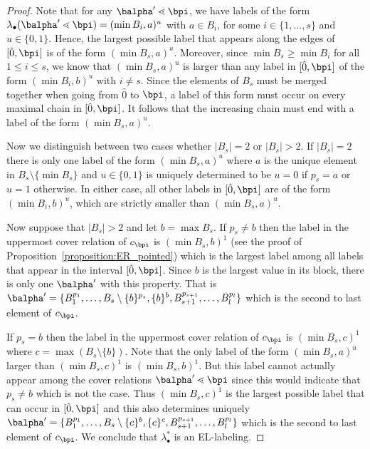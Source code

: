 \begin{proof}
Note that for any $\balpha'\lessdot \bpi$, we have labels of the form $\lambda_{\bullet}(\balpha'\lessdot \bpi)=(\min B_i,a)^u$ with $a\in B_i$, for some  $i\in\{1,\dots,s\}$ and $u\in\{0,1\}$. Hence,  the largest possible label that appears along the edges of $[\hat{0},\bpi]$ is of the form $(\min B_{s},a)^u$.  Moreover, since $\min B_s \geq \min B_i$ for all $1\leq i\leq s$, we know that $(\min B_{s},a)^u$ is larger than any label in $[\hat{0}, \bpi]$ of the form $(\min B_i, b)^u$ with $i\neq s$.   Since the elements of $B_s$ must be merged together when going from $\hat{0}$ to $\bpi$,  a label of this form must occur on every maximal chain in $[\hat{0},\bpi]$.  It follows that the increasing chain must end with a label of the form $(\min B_{s},a)^u$.  

Now we distinguish between two cases whether $|B_{s}|=2$ or $|B_{s}|>2$. If $|B_{s}|=2$ there is only one label of the form $(\min B_{s},a)^u$ where $a$ is the unique element in $B_{s}\setminus \{\min B_{s}\}$ and $u\in\{0,1\}$ is uniquely determined to be $u=0$ if $p_s=a$ or $u=1$ otherwise. In either case, all other labels in $[\hat{0},\bpi]$ are of the form $(\min B_{i},b)^u$, which are strictly smaller than $(\min B_{s},a)^u$.



Now suppose that $|B_{s}|>2$ and let $b=\max B_s$. If $p_s\neq b$ then the label in the uppermost cover relation of $c_{\bpi}$ is $(\min B_{s},b)^1$ (see the proof of Proposition~\ref{proposition:ER_pointed}) which is the largest label among all labels that appear in the interval $[\hat{0},\bpi]$.  Since $b$ is the largest value in its block, there is only one $\balpha'$ with this property. That is $\balpha'=\{B_1^{p_1},\dots,B_s\setminus\{b\}^{p_s},\{b\}^{b},B_{s+1}^{p_{s+1}},\dots,B_l^{p_l}\}$ which is the second to last element of $c_{\bpi}$. 

If $p_s= b$ then  the label in the uppermost cover relation of $c_{\bpi}$ is $(\min B_{s},c)^1$ where $c=\max (B_s \setminus \{b\})$. Note that the only label of the form $(\min B_{s},a)^u$ larger than   $(\min B_{s},c)^1$ is $(\min B_{s},b)^1$.   
But this label cannot actually appear among the cover relations  $\balpha'\lessdot \bpi$ since this would indicate that $p_s\neq b$ which is not the case. Thus $(\min B_{s},c)^1$ is the largest possible label that can occur  in $[\hat{0}, \bpi]$  and this also determines uniquely $\balpha'=\{B_1^{p_1},\dots,B_s\setminus\{c\}^{b},\{c\}^{c},B_{s+1}^{p_{s+1}},\dots,B_l^{p_l}\}$ which is the second to last element of $c_{\bpi}$. We conclude that $\lambda^*_\bullet$ is an EL-labeling.
\end{proof}

